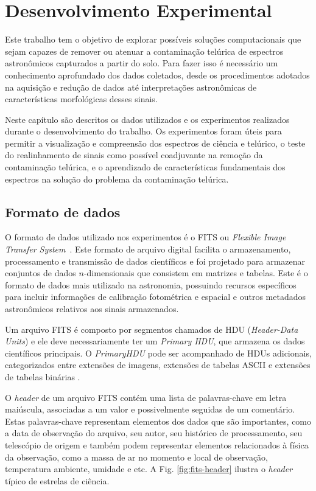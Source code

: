 \chapter{Desenvolvimento Experimental}
\label{cap:desenvolvimentos}

Este trabalho tem o objetivo de explorar possíveis soluções computacionais que sejam capazes de remover ou atenuar a contaminação telúrica de espectros astronômicos capturados a partir do solo. Para fazer isso é necessário um conhecimento aprofundado dos dados coletados, desde os procedimentos adotados na aquisição e redução de dados até interpretações astronômicas de características morfológicas desses sinais.

Neste capítulo são descritos os dados utilizados e os experimentos realizados durante o desenvolvimento do trabalho. Os experimentos foram úteis para permitir a visualização e compreensão dos espectros de ciência e telúrico, o teste do realinhamento de sinais como possível coadjuvante na remoção da contaminação telúrica, e o aprendizado de características fundamentais dos espectros na solução do problema da contaminação telúrica.  


\section{Formato de dados}

O formato de dados utilizado nos experimentos é o FITS ou \textit{Flexible Image Transfer System}~\citep{pence2010definition}. Este formato de arquivo digital facilita o armazenamento, processamento e transmissão de dados científicos e foi projetado para armazenar conjuntos de dados $n$-dimensionais que consistem em matrizes e tabelas. Este é o formato de dados mais utilizado na astronomia, possuindo recursos específicos para incluir informações de calibração fotométrica e espacial e outros metadados astronômicos relativos aos sinais armazenados.

Um arquivo FITS é composto por segmentos chamados de HDU (\textit{Header-Data Units}) e ele deve necessariamente ter um \textit{Primary HDU}, que armazena os dados científicos principais. O \textit{PrimaryHDU} pode ser acompanhado de HDUs adicionais, categorizados entre extensões de imagens, extensões de tabelas ASCII e extensões de tabelas binárias \citep{nasa-fits}.

O \textit{header} de um arquivo FITS contém uma lista de palavras-chave em letra maiúscula, associadas a um valor e possivelmente seguidas de um comentário. Estas palavras-chave representam elementos dos dados que são importantes, como a data de observação do arquivo, seu autor, seu histórico de processamento, seu telescópio de origem e também podem representar elementos relacionados à física da observação, como a massa de ar no momento e local de observação, temperatura ambiente, umidade e etc. A Fig. \ref{fig:fits-header} ilustra o \textit{header} típico de estrelas de ciência. 

